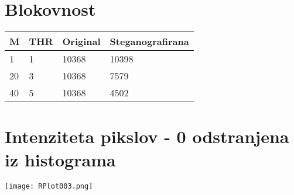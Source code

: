 \documentclass[12pt,a4paper]{article}
\begin{document}
\section{Blokovnost}
\begin{table}
    \begin{tabular}{llll}
    M     & THR & Original & Steganografirana \\ \hline
    1  & 1               &  10368     & 10398           \\
    20 & 3               & 10368         &   7579         \\
    40     & 5             & 10368        &   4502            \\
    \end{tabular}
\end{table}
\clearpage %
\section{Intenziteta pikslov - 0 odstranjena iz histograma}
\texttt{[image: RPlot003.png]}
\end{document}
